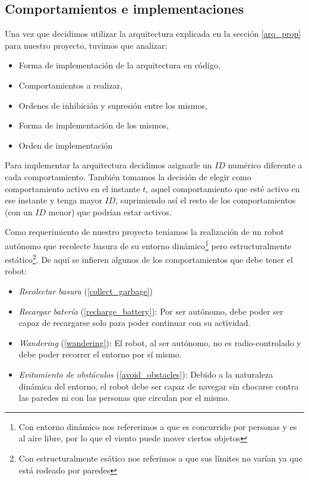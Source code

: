 
\subsection{Comportamientos e implementaciones}
\label{comportamientos}

Una vez que decidimos utilizar la arquitectura explicada en la secci\'on
\ref{arq_prop} para nuestro proyecto, tuvimos que analizar:
\begin{itemize}
\item{}Forma de implementaci\'on de la arquitectura en c\'odigo,
\item{}Comportamientos a realizar,
\item{}Ordenes de inhibici\'on y supresi\'on entre los mismos,
\item{}Forma de implementaci\'on de los mismos,
\item{}Orden de implementaci\'on
\end{itemize}

Para implementar la arquitectura decidimos asignarle un $ID$ num\'erico
diferente a cada comportamiento. Tambi\'en tomamos la decisi\'on de elegir como
comportamiento activo en el instante $t$, aquel comportamiento que est\'e
activo en ese instante y tenga mayor $ID$, suprimiendo as\'i el resto de los
comportamientos (con un $ID$ menor) que podr\'ian estar activos.

Como requerimiento de nuestro proyecto ten\'iamos la realizaci\'on de un robot
aut\'onomo que recolecte basura de su entorno din\'amico\footnote{Con entorno
din\'amico nos refererimos a que es concurrido por personas y es al aire
libre, por lo que el viento puede mover ciertos objetos} pero estructuralmente
est\'atico\footnote{Con estructuralmente es\'atico nos referimos a que sus
l\'imites no var\'ian ya que est\'a rodeado por paredes}.
De aqu\'i se infieren algunos de los comportamientos que debe tener
el robot:
\begin{itemize}
	\item{\emph{Recolectar basura} (\ref{collect_garbage})}
	\item{\emph{Recargar bater\'ia} (\ref{recharge_battery}):} Por ser
		aut\'onomo, debe poder ser capaz de recargarse solo para poder continuar
		con su actividad.
	\item{\emph{Wandering} (\ref{wandering}):} El robot, al ser aut\'onomo, no es
		radio-controlado y debe poder recorrer el entorno por s\'i mismo.
	\item{\emph{Evitamiento de obst\'aculos} (\ref{avoid_obstacles}):} Debido a
		la naturaleza din\'amica del entorno, el robot debe ser capaz de navegar
		sin chocarse contra las paredes ni con las personas que circulan por
		el mismo.
\end{itemize}

